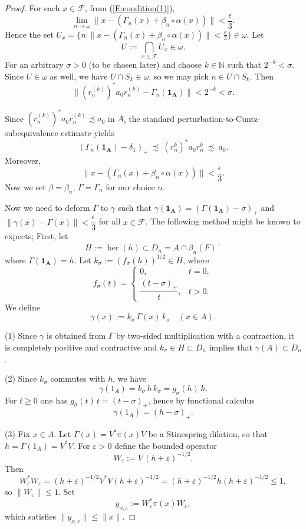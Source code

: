 \documentclass[10pt,a4paper]{amsart}
\def\her{\operatorname{her}}
\newcommand{\mc}{\mathcal}
\begin{document}
\begin{proof}
\noindent
For each $x \in \mc{F}$, from (\ref{E:condition(1)}), 
\[ \lim_{n\to \omega} \| x -(\Gamma_n(x)+ \beta_n \circ \alpha (x) )  \| < \frac{\epsilon}{3}. \]
Hence the set $U_x=\{n \mid \| x -(\Gamma_n(x)+ \beta_n \circ \alpha (x) )  \| < \frac{\epsilon}{3} \} \in \omega$. 
 Let
\[
U:=\bigcap_{x\in\mc{F}} U_x \in\omega.
\]
\noindent
For an arbitrary $\sigma >0$ (to be chosen later) and choose $k\in\mathbb N$ such that $2^{-k}<\sigma$. Since $U\in\omega$ as well, we have $U\cap S_k\in\omega$,
so we may pick $n\in U\cap S_k$. Then
\[
\|(r^{(k)}_{n})^*a_0 r^{(k)}_{n}-\Gamma_{n}(\mathbf{1_A})\|<2^{-k}<\sigma.
\]

Since $(r^{(k)}_{n})^*a_0 r^{(k)}_{n}\precsim a_0$ in $A$, the standard
perturbation-to-Cuntz-sub\-equivalence estimate yields
\[
(\Gamma_{n}(\mathbf{1_A})-\delta_1)_+\ \precsim\ (r^k_{n})^*a_0 r^k_{n}
\ \precsim\ a_0.
\]
Moreover, 
\begin{equation}\label{E:normestimate}
\| x -(\Gamma_{n}(x)+ \beta_{n} \circ \alpha (x) )  \| < \frac{\epsilon}{3}. 
\end{equation}
Now we set $\beta=\beta_n$, $\Gamma=\Gamma_n$ for our choice $n$. 

Now we need to deform $\Gamma$ to $\gamma$ such that $\gamma(\mathbf{1_A})= (\Gamma(\mathbf{1_A})-\sigma)_{+}$ and $\| \gamma(x) -\Gamma(x)\| < \dfrac{\epsilon}{3}$ for all $x \in \mc{F}$.  The following method might be known to expects;   
 First,  let 
\[H:=\her(h) \subset D_n=A\cap \beta_n(F)^{\perp} \] where $\Gamma(\mathbf{1_A})=h$.  Let $k_\sigma:=(f_\sigma(h))^{1/2} \in H$, where
\[
f_\sigma(t)=
\begin{cases}
0,& t=0,\\
\dfrac{(t-\sigma)_+}{t},& t > 0.
\end{cases}
\]
We define
\[
 \gamma(x):=k_{\sigma}\,\Gamma(x)\,k_{\sigma} \quad (x\in A).
\]

(1) Since $\gamma$ is obtained from $\Gamma$ by two-sided multiplication with a contraction,
it is completely positive and contractive and $k_{\sigma} \in H \subset D_n$ implies that $\gamma(A) \subset D_n$. 

\smallskip
(2) Since $k_\sigma$ commutes with $h$, we have
\[
\gamma(1_A)=k_\sigma\,h\,k_\sigma=g_\sigma(h)\,h.
\]
For  $t\ge 0$ one has $g_\sigma(t)\,t=(t-\sigma)_+$, hence by functional calculus
\[
\gamma(1_A)=(h-\sigma)_+.
\]

\smallskip
(3) Fix $x\in A$.
Let $\Gamma(x)=V^*\pi(x)V$ be a Stinespring dilation, so that $h=\Gamma(1_A)=V^*V$.
For $\varepsilon>0$ define the bounded operator
\[
W_\varepsilon:=V\,(h+\varepsilon)^{-1/2}.
\]
Then
\[
W_\varepsilon^*W_\varepsilon
=(h+\varepsilon)^{-1/2}V^*V(h+\varepsilon)^{-1/2}
=(h+\varepsilon)^{-1/2}h(h+\varepsilon)^{-1/2}
\le 1,
\]
so $\|W_\varepsilon\|\le 1$.
Set
\[
y_{x,\varepsilon}:=W_\varepsilon^*\pi(x)W_\varepsilon,
\]
which satisfies $\|y_{x,\varepsilon}\|\le \|x\|$.


\end{proof}
\end{document}
